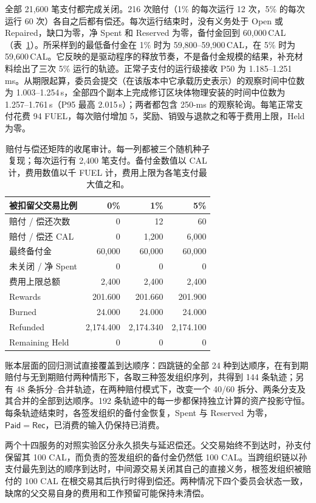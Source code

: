 全部 21,600 笔支付都完成关闭。216 次赔付（1\% 的每次运行 12 次，5\% 的每次运行 60 次）各自之后都有偿还。每次运行结束时，没有义务处于 Open 或 Repaired，缺口为零，净 Spent 和 Reserved 为零，备付金回到 60,000\,CAL（表~\ref{tab:eval-audit}）。所采样到的最低备付金在 1\% 时为 59,800--59,900\,CAL，在 5\% 时为 59,600\,CAL。它反映的是驱动程序的释放节奏，不是备付金规模的结果，补充材料绘出了三次 5\% 运行的轨迹。正常子支付的运行级接收 P50 为 1.185--1.251\,ms。从期限起算，委员会提交（在该版本中它承载历史表示）的观察时间中位数为 1.003--1.254\,s，全部四个副本上完成修订区块体物理安装的时间中位数为 1.257--1.761\,s（P95 最高 2.015\,s）；两者都包含 250-ms 的观察轮询。每笔正常支付花费 94 FUEL，每次赔付增加 5，奖励、销毁与退款之和等于费用上限，Held 为零。

\begin{table}[t]
  \caption{赔付与偿还矩阵的收尾审计。每一列都被三个随机种子复现；每次运行有 2,400 笔支付。备付金数值以 CAL 计，费用数值以千 FUEL 计，费用上限为各笔支付最大值之和。}
  \label{tab:eval-audit}
  \centering
  \small
  \begin{tabular}{@{}lrrr@{}}
    \toprule
    被扣留父交易比例 & 0\% & 1\% & 5\% \\
    \midrule
    赔付 / 偿还次数 & 0 & 12 & 60 \\
    赔付 / 偿还 CAL & 0 & 1,200 & 6,000 \\
    最终备付金 & 60,000 & 60,000 & 60,000 \\
    未关闭 / 净 Spent & 0 & 0 & 0 \\
    费用上限总额 & 2,400 & 2,400 & 2,400 \\
    Rewards & 201.600 & 201.660 & 201.900 \\
    Burned & 24.000 & 24.000 & 24.000 \\
    Refunded & 2,174.400 & 2,174.340 & 2,174.100 \\
    Remaining Held & 0 & 0 & 0 \\
    \bottomrule
  \end{tabular}
\end{table}

账本层面的回归测试直接覆盖到达顺序：四跳链的全部 24 种到达顺序，在有到期赔付与无到期赔付两种情形下，各取三种签发组织序列，共得到 144 条轨迹；另有 48 条拆分--合并轨迹，在两种赔付模式下，改变一个 40/60 拆分、两条分支及其合并的全部到达顺序。192 条轨迹中的每一步都保持独立计算的资产投影守恒。每条轨迹结束时，各签发组织的备付金恢复，Spent 与 Reserved 为零，$\mathsf{Paid}=\mathsf{Rec}$，已消费的输入仍保持已消费。

两个十四服务的对照实验区分永久损失与延迟偿还。父交易始终不到达时，孙支付保留其 100 CAL，而负责的签发组织的备付金仍然低 100 CAL。当跨组织链以孙支付最先到达的顺序到达时，中间源交易关闭其自己的直接义务，根签发组织被赔付的 100 CAL 在根交易其后执行时得到偿还。两种情况下四个委员会状态一致，缺席的父交易自身的费用和工作预留可能保持未清偿。

